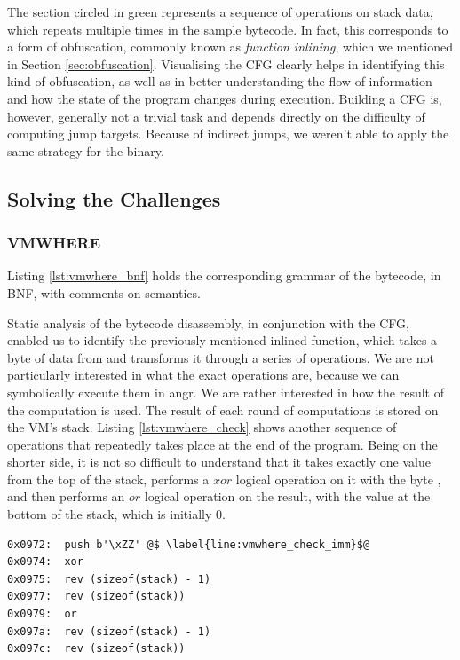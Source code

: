 The section circled in green represents a sequence of operations on stack data, which repeats multiple times in the sample bytecode. In fact, this corresponds to a form of obfuscation, commonly known as \emph{function inlining}, which we mentioned in Section \ref{sec:obfuscation}. Visualising the \gls{CFG} clearly helps in identifying this kind of obfuscation, as well as in better understanding the flow of information and how the state of the program changes during execution. Building a \gls{CFG} is, however, generally not a trivial task and depends directly on the difficulty of computing jump targets. Because of indirect jumps, we weren't able to apply the same strategy for the  binary.

\subsection{Solving the Challenges}

\subsubsection{VMWHERE}

Listing \ref{lst:vmwhere_bnf} holds the corresponding grammar of the  bytecode, in \gls{BNF}, with comments on semantics.

Static analysis of the bytecode disassembly, in conjunction with the \gls{CFG}, enabled us to identify the previously mentioned inlined function, which takes a byte of data from  and transforms it through a series of operations. We are not particularly interested in what the exact operations are, because we can symbolically execute them in angr. We are rather interested in how the result of the computation is used. The result of each round of computations is stored on the \gls{VM}'s stack. Listing \ref{lst:vmwhere_check} shows another sequence of operations that repeatedly takes place at the end of the program. Being on the shorter side, it is not so difficult to understand that it takes exactly one value from the top of the stack, performs a $xor$ logical operation on it with the byte \cc{\xZZ}, and then performs an $or$ logical operation on the result, with the value at the bottom of the stack, which is initially $0$.

\begin{lstlisting}[label={lst:vmwhere_check}, caption={Disassembly of \cc{vmwhere} bytecode, which performs a bitwise-xor operation on the top two values on top of the stack, and then a bitwise-or operation on the previous result, and the value at the bottom of the stack.}]
0x0972:  push b'\xZZ' @$ \label{line:vmwhere_check_imm}$@
0x0974:  xor
0x0975:  rev (sizeof(stack) - 1)
0x0977:  rev (sizeof(stack))
0x0979:  or
0x097a:  rev (sizeof(stack) - 1)
0x097c:  rev (sizeof(stack))
\end{lstlisting}

